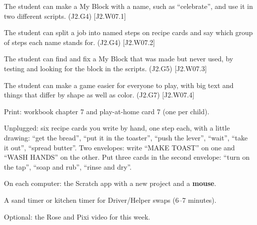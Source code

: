 
\begin{objectives}
  \item The student can make a My Block with a name, such as \enquote{celebrate}, and use it in two different scripts. (J2.G4) [J2.W07.1]
  \item The student can split a job into named steps on recipe cards and say which group of steps each name stands for. (J2.G4) [J2.W07.2]
  \item The student can find and fix a My Block that was made but never used, by testing and looking for the block in the scripts. (J2.G5) [J2.W07.3]
  \item The student can make a game easier for everyone to play, with big text and things that differ by shape as well as color. (J2.G7) [J2.W07.4]
\end{objectives}

\begin{materials}
  \item Print: workbook chapter 7 and play-at-home card 7 (one per child).
  \item Unplugged: six recipe cards you write by hand, one step each, with a little drawing: \enquote{get the bread}, \enquote{put it in the toaster}, \enquote{push the lever}, \enquote{wait}, \enquote{take it out}, \enquote{spread butter}. Two envelopes: write \enquote{MAKE TOAST} on one and \enquote{WASH HANDS} on the other. Put three cards in the second envelope: \enquote{turn on the tap}, \enquote{soap and rub}, \enquote{rinse and dry}.
  \item On each computer: the Scratch app with a new project and a \textbf{mouse}.
  \item A sand timer or kitchen timer for Driver/Helper swaps (6--7 minutes).
  \item Optional: the Rose and Pixi video for this week.
\end{materials}

